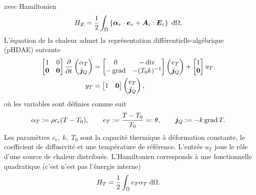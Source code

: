 avec Hamiltonien
\[
H_E = \energy{\bm{\alpha}_v \cdot \bm{e}_v + \bm{A}_{\varepsilon} \cddot \bm{E}_{\varepsilon}}.
\]
L'équation de la chaleur admet la représentation différentielle-algébrique (pHDAE) suivante
\begin{equation*}
\begin{aligned}
\begin{bmatrix}
1 & 0 \\
\bm{0} & \bm{0} \\
\end{bmatrix}
\diffp{}{t}
\begin{pmatrix}
\alpha_T \\
\bm{j}_Q \\
\end{pmatrix} &= 
\begin{bmatrix}
0 & -\div \\
-\grad & -(T_0 k)^{-1} \\
\end{bmatrix}
\begin{pmatrix}
e_T \\
\bm{j}_Q \\
\end{pmatrix} + 
\begin{bmatrix}
1 \\
\bm{0} \\
\end{bmatrix} u_T, \\
y_T &= \begin{bmatrix}
1 & \bm{0} \\
\end{bmatrix} \begin{pmatrix}
e_T \\
\bm{j}_Q \\
\end{pmatrix},
\end{aligned}
\end{equation*} 
où les variables sont définies comme suit
\begin{equation*}
\alpha_T := \rho c_\epsilon (T-T_0), \qquad e_T := \frac{T-T_0}{T_0} =: \theta, \qquad \bm{j}_Q := -k \operatorname*{grad} T.
\end{equation*}
Les paramètres $c_\epsilon, \; k, \; T_0$ sont la capacité thermique à déformation constante, le coefficient de diffusivité et une température de référence.
L'entrée $u_T$ joue le rôle d'une source de chaleur distribuée. L'Hamiltonien corresponds à une fonctionnelle quadratique (c'est n'est pas l'énergie interne)
\begin{equation*}
H_T = \frac{1}{2}\int_\Omega {e}_T {\alpha}_T \d\Omega.
\end{equation*}
